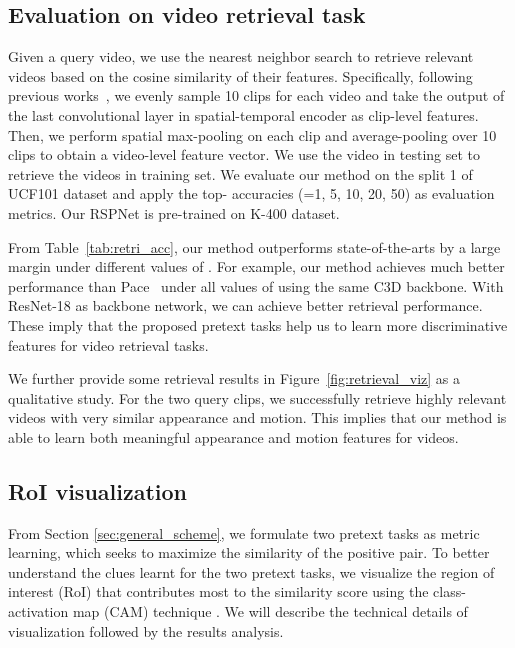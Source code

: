 \documentclass[final]{cvpr}
\begin{document}
\subsection{Evaluation on video retrieval task}
Given a query video, we use the nearest neighbor search to retrieve relevant videos based on the cosine similarity of their features. 
Specifically, following previous works~\cite{speednet,xu2019self}, we evenly sample 10 clips for each video and take the output of the last convolutional layer in spatial-temporal encoder as clip-level features. Then, we perform spatial max-pooling on each clip and average-pooling over 10 clips to obtain a video-level feature vector. We use the video in testing set to retrieve the videos in training set.
We evaluate our method on the split 1 of UCF101 dataset and apply the top- accuracies (=1, 5, 10, 20, 50) as evaluation metrics.
Our RSPNet is pre-trained on K-400 dataset.


From Table~\ref{tab:retri_acc}, our method outperforms state-of-the-arts by a large margin under different values of . 
For example, our method achieves much better performance than Pace~\cite{pace} under all values of  using the same C3D backbone. With ResNet-18 as backbone network, we can achieve better retrieval performance. These imply that the proposed pretext tasks help us to learn more discriminative features for video retrieval tasks. 



We further provide some retrieval results in Figure~\ref{fig:retrieval_viz} as a qualitative study. For the two query clips, we successfully retrieve highly relevant videos with very similar appearance and motion. This implies that our method is able to learn both meaningful appearance and motion features for videos.











\subsection{RoI visualization} 
From Section \ref{sec:general_scheme}, we formulate two pretext tasks as metric learning, which seeks to maximize the similarity of the positive pair.  To better understand the clues learnt for the two pretext tasks, we visualize the region of interest (RoI) that contributes most to the similarity score using the class-activation map (CAM) technique \cite{zhou2016learning}.
We will describe the technical details of visualization followed by the results analysis. 
\end{document}
